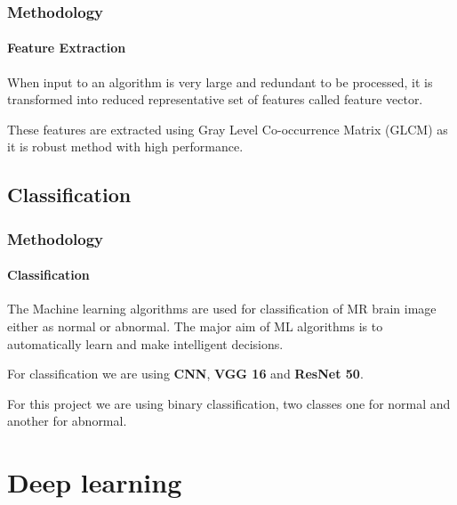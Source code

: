 \documentclass[10pt, aspectratio=169]{beamer}
\begin{document}
	\begin{frame}
		\frametitle{Methodology}
		\framesubtitle{Feature Extraction}

		When input to an algorithm is very large and redundant to be processed,
		it is transformed into reduced representative set of features called
		feature vector.

		\vspace{1cm}

		These features are extracted using Gray Level Co-occurrence Matrix
		(GLCM) as it is robust method with high performance.
	\end{frame}

	\subsection{Classification}

	\begin{frame}
		\frametitle{Methodology}
		\framesubtitle{Classification}

		The Machine learning algorithms are used for classification of MR brain
		image either as normal or abnormal.  The major aim of ML algorithms is
		to automatically learn and make intelligent decisions.

		\vspace{0.5cm}

		For classification we are using \textbf{CNN}, \textbf{VGG 16} and
		\textbf{ResNet 50}.

		\vspace{0.5cm}

		For this project we are using binary classification, two classes one for
		normal and another for abnormal.

	\end{frame}

	\section{Deep learning}
\end{document}
